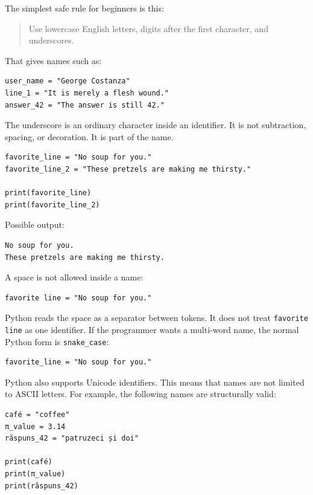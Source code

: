 The simplest safe rule for beginners is this:

\begin{quote}
Use lowercase English letters, digits after the first character, and underscores.
\end{quote}

That gives names such as:

\begin{verbatim}
user_name = "George Costanza"
line_1 = "It is merely a flesh wound."
answer_42 = "The answer is still 42."
\end{verbatim}

The underscore is an ordinary character inside an identifier. It is not subtraction, spacing, or decoration. It is part of the name.

\begin{verbatim}
favorite_line = "No soup for you."
favorite_line_2 = "These pretzels are making me thirsty."

print(favorite_line)
print(favorite_line_2)
\end{verbatim}

Possible output:

\begin{verbatim}
No soup for you.
These pretzels are making me thirsty.
\end{verbatim}

A space is not allowed inside a name:

\begin{verbatim}
favorite line = "No soup for you."
\end{verbatim}

Python reads the space as a separator between tokens. It does not treat \texttt{favorite line} as one identifier. If the programmer wants a multi-word name, the normal Python form is \texttt{snake\_case}:

\begin{verbatim}
favorite_line = "No soup for you."
\end{verbatim}

Python also supports Unicode identifiers. This means that names are not limited to ASCII letters. For example, the following names are structurally valid:

\begin{verbatim}
café = "coffee"
π_value = 3.14
răspuns_42 = "patruzeci și doi"

print(café)
print(π_value)
print(răspuns_42)
\end{verbatim}

